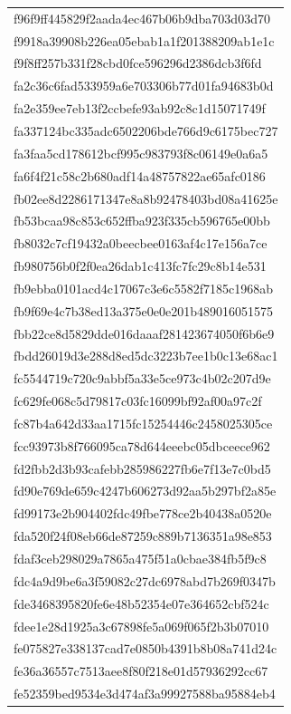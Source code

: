 \begin{tabular}{l}
f96f9ff445829f2aada4ec467b06b9dba703d03d70 \\
f9918a39908b226ea05ebab1a1f201388209ab1e1c \\
f9f8ff257b331f28cbd0fce596296d2386dcb3f6fd \\
fa2c36c6fad533959a6e703306b77d01fa94683b0d \\
fa2e359ee7eb13f2ccbefe93ab92c8c1d15071749f \\
fa337124bc335adc6502206bde766d9c6175bec727 \\
fa3faa5cd178612bcf995c983793f8c06149e0a6a5 \\
fa6f4f21c58c2b680adf14a48757822ae65afc0186 \\
fb02ee8d2286171347e8a8b92478403bd08a41625e \\
fb53bcaa98c853c652ffba923f335cb596765e00bb \\
fb8032c7cf19432a0beecbee0163af4c17e156a7ce \\
fb980756b0f2f0ea26dab1c413fc7fc29c8b14e531 \\
fb9ebba0101acd4c17067c3e6c5582f7185c1968ab \\
fb9f69e4c7b38ed13a375e0e0e201b489016051575 \\
fbb22ce8d5829dde016daaaf281423674050f6b6e9 \\
fbdd26019d3e288d8ed5dc3223b7ee1b0c13e68ac1 \\
fc5544719c720c9abbf5a33e5ce973c4b02c207d9e \\
fc629fe068c5d79817c03fc16099bf92af00a97c2f \\
fc87b4a642d33aa1715fc15254446c2458025305ce \\
fcc93973b8f766095ca78d644eeebc05dbceece962 \\
fd2fbb2d3b93cafebb285986227fb6e7f13e7c0bd5 \\
fd90e769de659c4247b606273d92aa5b297bf2a85e \\
fd99173e2b904402fdc49fbe778ce2b40438a0520e \\
fda520f24f08eb66de87259c889b7136351a98e853 \\
fdaf3ceb298029a7865a475f51a0cbae384fb5f9c8 \\
fdc4a9d9be6a3f59082c27dc6978abd7b269f0347b \\
fde3468395820fe6e48b52354e07e364652cbf524c \\
fdee1e28d1925a3c67898fe5a069f065f2b3b07010 \\
fe075827e338137cad7e0850b4391b8b08a741d24c \\
fe36a36557c7513aee8f80f218e01d57936292cc67 \\
fe52359bed9534e3d474af3a99927588ba95884eb4 \\

\end{tabular}
